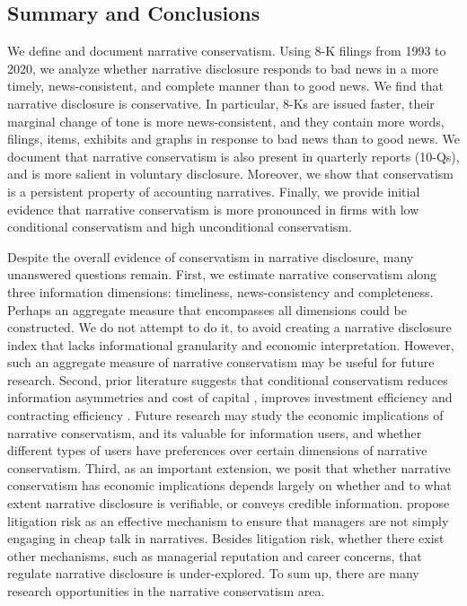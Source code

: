 \documentclass[letterpaper,12pt]{article}
\begin{document}
\begin{spacing}{1.5}
\section{Summary and Conclusions}

\noindent We define and document narrative conservatism. Using 8-K filings from 1993 to 2020, we analyze whether narrative disclosure responds to bad news in a more timely, news-consistent, and complete manner than to good news. We find that narrative disclosure is conservative. In particular, 8-Ks are issued faster, their marginal change of tone is more news-consistent, and they contain more words, filings, items, exhibits and graphs in response to bad news than to good news. We document that narrative conservatism is also present in quarterly reports (10-Qs), and is more salient in voluntary disclosure. Moreover, we show that conservatism is a persistent property of accounting narratives. Finally, we provide initial evidence that narrative conservatism is more pronounced in firms with low conditional conservatism and high unconditional conservatism.

Despite the overall evidence of conservatism in narrative disclosure, many unanswered questions remain. First, we estimate narrative conservatism along three information dimensions: timeliness, news-consistency and completeness. Perhaps an aggregate measure that encompasses all dimensions could be constructed. We do not attempt to do it, to avoid creating a narrative disclosure index that lacks informational granularity and economic interpretation. However, such an aggregate measure of narrative conservatism may be useful for future research. Second, prior literature suggests that conditional conservatism reduces information asymmetries \cite{garcialaraInformationConsequencesAccounting2014} and cost of capital \cite{suijsValueRelevanceAsymmetric2008, garcialaraConditionalConservatismCost2011, guayConservativeDisclosure2018}, improves investment efficiency \cite{francisAcquisitionProfitabilityTimely2010, bushmanCapitalAllocationTimely2011, garcialaraAccountingConservatismFirm2016} and contracting efficiency \cite{wattsConservatismAccountingPart2003, zhangContractingBenefitsAccounting2008}. Future research may study the economic implications of narrative conservatism, and its valuable for information users, and whether different types of users have preferences over certain dimensions of narrative conservatism.  Third, as an important extension, we posit that whether narrative conservatism has economic implications depends largely on whether and to what extent narrative disclosure is verifiable, or conveys credible information.  propose litigation risk as an effective mechanism to ensure that managers are not simply engaging in cheap talk in narratives. Besides litigation risk, whether there exist other mechanisms, such as managerial reputation and career concerns, that regulate narrative disclosure is under-explored. To sum up, there are many research opportunities in the narrative conservatism area.

\end{spacing}

\newpage



\newpage


\newpage


\newpage


\newpage
\setcounter{page}{1}

\end{document}
